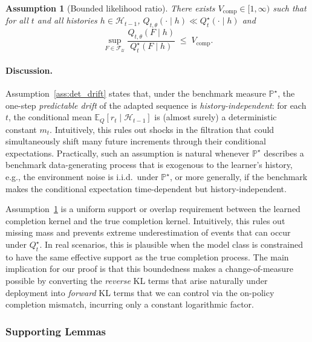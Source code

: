 \documentclass[11pt]{article}
\newtheorem{assumption}{Assumption}
\renewcommand{\P}{\mathbb{P}}
\providecommand{\E}{\mathbb{E}}
\begin{document}
\begin{assumption}[Bounded likelihood ratio]
\label{assump:B-comp-overlap}
There exists \(V_{\mathrm{comp}}\in[1,\infty)\) such that for all \(t\) and all histories \(h\in\mathcal{H}_{t-1}\),
\(Q_{t,\theta}(\cdot\mid h)\ll Q^\star_t(\cdot\mid h)\) and
\[
\sup_{F\in\mathcal{F}_{\mathcal{U}}}
\frac{Q_{t,\theta}(F\mid h)}{Q^\star_t(F\mid h)}
\;\le\;
V_{\mathrm{comp}}.
\]
\end{assumption}

\paragraph{Discussion.}
Assumption~\ref{ass:det_drift} states that, under the benchmark measure $\P^\star$, the one-step
\emph{predictable drift} of the adapted sequence is \emph{history-independent}:
for each $t$, the conditional mean $\E_Q[r_t\mid\mathcal H_{t-1}]$ is (almost surely) a
deterministic constant $m_t$. Intuitively, this rules out shocks in the filtration that could simultaneously shift many
future increments through their conditional expectations. Practically, such an assumption is natural whenever $\P^\star$ describes a benchmark
data-generating process that is exogenous to the learner’s history, e.g., the environment noise is i.i.d.\ under $\P^\star$, or more generally, if the benchmark makes the conditional expectation time-dependent but history-independent.

Assumption~\ref{assump:B-comp-overlap} is a uniform support or overlap requirement between the learned completion kernel and the true completion kernel. Intuitively, this rules out missing mass and prevents extreme underestimation of events that can occur under $Q_t^\star$. In real scenarios, this is plausible when the model class is constrained to have the same effective support as the true completion process. The main implication for our proof is that this boundedness makes a change-of-measure possible by converting the \emph{reverse} KL terms that arise naturally under deployment into \emph{forward} KL terms that we can control via the on-policy completion mismatch, incurring only a constant logarithmic factor.






\subsubsection{Supporting Lemmas}
\label{app:thm2.4:supporting_lemmsa}
\end{document}
